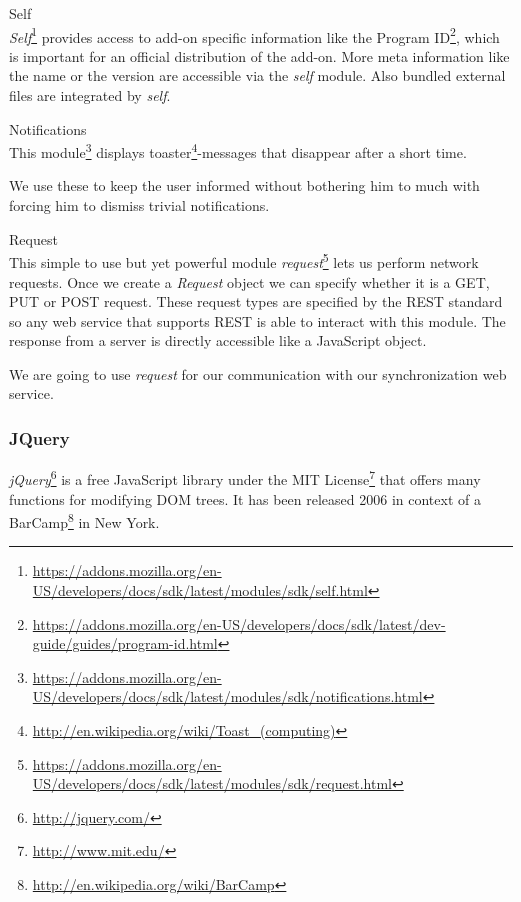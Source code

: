 \begin{description}
\item Self\\
\emph{Self}\footnote{\url{https://addons.mozilla.org/en-US/developers/docs/sdk/latest/modules/sdk/self.html}} provides access to add-on specific information like the Program ID\footnote{\url{https://addons.mozilla.org/en-US/developers/docs/sdk/latest/dev-guide/guides/program-id.html}}, which is important for an official distribution of the add-on. More meta information like the name or the version are accessible via the \emph{self} module. Also bundled external files are integrated by \emph{self}.

\item Notifications\\
This module\footnote{\url{https://addons.mozilla.org/en-US/developers/docs/sdk/latest/modules/sdk/notifications.html}} displays toaster\footnote{\url{http://en.wikipedia.org/wiki/Toast_(computing)}}-messages that disappear after a short time.

We use these to keep the user informed without bothering him to much with forcing him to dismiss trivial notifications.

\item Request\\
This simple to use but yet powerful module \emph{request}\footnote{\url{https://addons.mozilla.org/en-US/developers/docs/sdk/latest/modules/sdk/request.html}} lets us perform network requests. Once we create a \emph{Request} object we can specify whether it is a GET, PUT or POST request. These request types are specified by the REST standard so any web service that supports REST is able to interact with this module\cite{fielding2000principled}. The response from a server is directly accessible like a JavaScript object. 

We are going to use \emph{request} for our communication with our synchronization web service. 

\end{description}

\subsubsection*{JQuery}
\emph{jQuery}\footnote{\url{http://jquery.com/}} is a free JavaScript library under the MIT License\footnote{\url{http://www.mit.edu/}} that offers many functions for modifying DOM trees. It has been released 2006 in context of a BarCamp\footnote{\url{http://en.wikipedia.org/wiki/BarCamp}} in New York.


